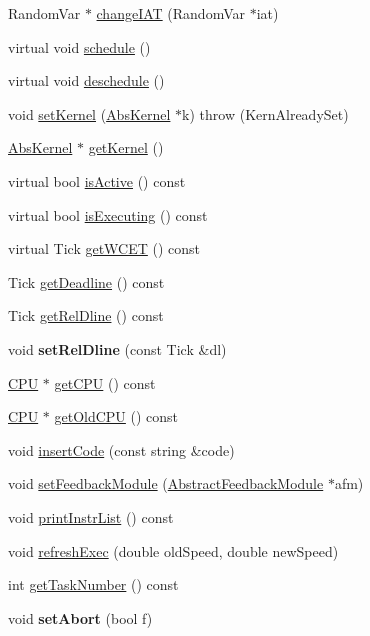\begin{DoxyCompactItemize}
\item 
Random\+Var $\ast$ \hyperlink{classRTSim_1_1Task_ae1aa066bab97f7ae4fddfac5b0bf41ee}{change\+I\+AT} (Random\+Var $\ast$iat)
\item 
virtual void \hyperlink{classRTSim_1_1Task_a9477a7af47247368e05f8f16b0f5a28b}{schedule} ()
\item 
virtual void \hyperlink{classRTSim_1_1Task_a7257e6c1e400ecb13ab70e3dee8880c8}{deschedule} ()
\item 
void \hyperlink{classRTSim_1_1Task_a8688e84e3bd7f04e6f8fcdfbcea84d40}{set\+Kernel} (\hyperlink{classRTSim_1_1AbsKernel}{Abs\+Kernel} $\ast$k)  throw (\+Kern\+Already\+Set)
\item 
\hyperlink{classRTSim_1_1AbsKernel}{Abs\+Kernel} $\ast$ \hyperlink{classRTSim_1_1Task_a3f967017ca8660542a7bda106759a3f2}{get\+Kernel} ()
\item 
virtual bool \hyperlink{classRTSim_1_1Task_ae51323db083ab919a2178e07f36ad07b}{is\+Active} () const 
\item 
virtual bool \hyperlink{classRTSim_1_1Task_a86f17c10176f70984a81ad8b06290ae8}{is\+Executing} () const 
\item 
virtual Tick \hyperlink{classRTSim_1_1Task_aacfe0567a0c1f2cb38827022567e9d4f}{get\+W\+C\+ET} () const 
\item 
Tick \hyperlink{classRTSim_1_1Task_ab495e2185796b06b00059e879be0d350}{get\+Deadline} () const 
\item 
Tick \hyperlink{classRTSim_1_1Task_a4140b594cc4f42c3b9c94b54af800c60}{get\+Rel\+Dline} () const 
\item 
void {\bfseries set\+Rel\+Dline} (const Tick \&dl)\hypertarget{classRTSim_1_1Task_adc68100eef6022e68d1a4d71c2ce6c6b}{}\label{classRTSim_1_1Task_adc68100eef6022e68d1a4d71c2ce6c6b}

\item 
\hyperlink{classRTSim_1_1CPU}{C\+PU} $\ast$ \hyperlink{classRTSim_1_1Task_a2a6ed14fa64a0c16d869532504a20119}{get\+C\+PU} () const 
\item 
\hyperlink{classRTSim_1_1CPU}{C\+PU} $\ast$ \hyperlink{classRTSim_1_1Task_a7345e59f9abdea9ce5e7db09f1cc1777}{get\+Old\+C\+PU} () const 
\item 
void \hyperlink{classRTSim_1_1Task_adf7514e4b8692e09972c299f41f5d399}{insert\+Code} (const string \&code)
\item 
void \hyperlink{classRTSim_1_1Task_a5627d2c5eeda74658f9434c91d72cd76}{set\+Feedback\+Module} (\hyperlink{classRTSim_1_1AbstractFeedbackModule}{Abstract\+Feedback\+Module} $\ast$afm)
\item 
void \hyperlink{classRTSim_1_1Task_ae3668377595483e96d123e5dc0bb05be}{print\+Instr\+List} () const 
\item 
void \hyperlink{classRTSim_1_1Task_a5d1ceb465d71ed07ed1f7047c685a86f}{refresh\+Exec} (double old\+Speed, double new\+Speed)
\item 
int \hyperlink{classRTSim_1_1Task_a06fa9011b893f338fd385f0d0ac4c5ad}{get\+Task\+Number} () const 
\item 
void {\bfseries set\+Abort} (bool f)\hypertarget{classRTSim_1_1Task_a562e4a8a1c5b13bc3f1cbfb670c1facc}{}\label{classRTSim_1_1Task_a562e4a8a1c5b13bc3f1cbfb670c1facc}


\end{DoxyCompactItemize}
